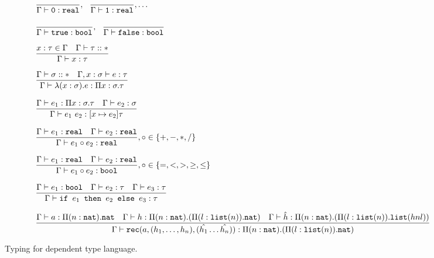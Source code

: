 \begin{figure}
\[
\begin{array}{lr}
 \\ \\
\dfrac{}{\Gamma \vdash \texttt{0}: \texttt{real}}, \ \ \dfrac{}{\Gamma \vdash \texttt{1}: \texttt{real}}, \ldots \\ \\
\dfrac{}{\Gamma \vdash \texttt{true} : \texttt{bool}}, \ \ \dfrac{}{\Gamma \vdash \texttt{false} : \texttt{bool}} \\  \\
\dfrac{x : \tau \in \Gamma \ \ \ \Gamma \vdash \tau :: *}{\Gamma \vdash x : \tau } \\ \\ 
\dfrac{\Gamma \vdash \sigma :: * \ \ \ \Gamma, x : \sigma \vdash e : \tau}
	{\Gamma \vdash \lambda (x : \sigma).e : \Pi x:\sigma.\tau } \\ \\
\dfrac{\Gamma \vdash e_1: \Pi x:\sigma.\tau \ \ \ \Gamma \vdash e_2 : \sigma}
	{\Gamma \vdash e_1 \ e_2 : [x \mapsto e_2]\tau} \\ \\
\dfrac{\Gamma \vdash e_1 : \texttt{real} \ \ \ \Gamma \vdash e_2 : \texttt{real}}
	{\Gamma \vdash e_1 \circ e_2 : \texttt{real}}
, \circ \in \{+,-,*,/\} \\ \\ 
\dfrac{\Gamma \vdash e_1 : \texttt{real} \ \ \ \Gamma \vdash e_2 : \texttt{real}}
	{\Gamma \vdash e_1 \circ e_2 : \texttt{bool}}
	, \circ \in \{=, <, >, \geq, \leq\} \\ \\ 
\dfrac{\Gamma \vdash e_1 : \texttt{bool} \ \ \ \Gamma \vdash e_2 : \tau \ \ \ \Gamma \vdash e_3 : \tau}
	{\Gamma \vdash \ifelse{e_1}{e_2}{e_3} : \tau} \\ \\ 
\dfrac{\Gamma \vdash a: \Pi (n:\texttt{nat}).\texttt{nat} \ \ \ \Gamma \vdash h: \Pi(n:\texttt{nat}).(\Pi (l:\lst(n)).\texttt{nat}) \ \ \ \Gamma \vdash \hat{h}: \Pi(n: \texttt{nat}).(\Pi(l : \lst(n)).\lst(h n l))}
	{\Gamma \vdash \texttt{rec}(a, (h_1, \ldots, h_n), (\hat{h_1} \ldots \hat{h_n})) : \Pi(n:\texttt{nat}).(\Pi (l:\lst(n)).\texttt{nat})}
\end{array}
\]
\caption{Typing for dependent type language.}
\end{figure}


